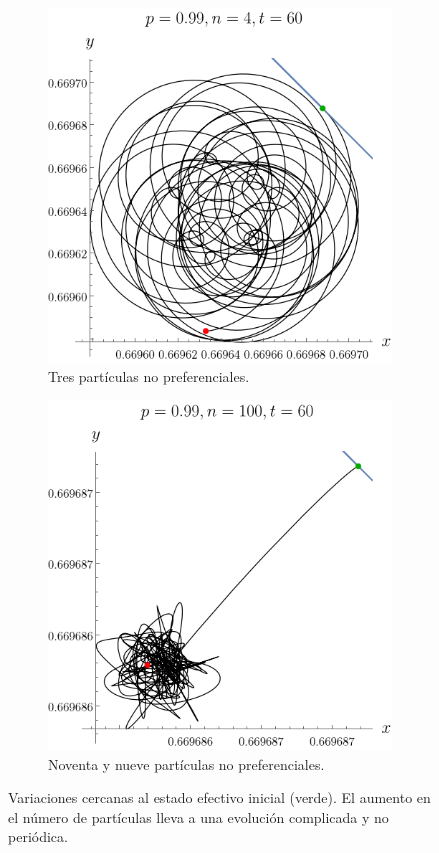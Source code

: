 \begin{figure}[ht!]
    \centering
    \begin{subfigure}{0.5\textwidth}
      \centering
      \includegraphics[width=0.9\linewidth]{chapter3/figures_separable/local_Z_evol_n=4_p=0.99_from_-3_to_3_end=60.png}
      \caption{Tres partículas no preferenciales.}
    \end{subfigure}%
    \begin{subfigure}{0.5\textwidth}
      \centering
      \includegraphics[width=0.9\linewidth]{chapter3/figures_separable/local_Z_evol_n=100_p=0.99_from_-3_to_3_end=60.png}
      \caption{Noventa y nueve partículas no preferenciales.}
    \end{subfigure}
    \caption{Variaciones cercanas al estado efectivo inicial (verde). El aumento en el número de partículas lleva a una evolución complicada y no periódica.}\label{fig:PrefInv1}
\end{figure}

